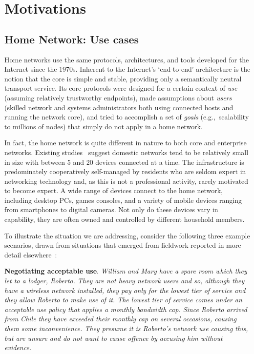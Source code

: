 \section{Motivations}\label{s:evolution}

\subsection{Home Network: Use cases}

Home networks use the same protocols, architectures, and tools developed for the
Internet since the 1970s.  Inherent to the Internet's `end-to-end' architecture
is the notion that the core is simple and stable, providing only a semantically
neutral transport service.  Its core protocols were designed for a certain
context of \emph{use} (assuming relatively trustworthy endpoints), made
assumptions about \emph{users} (skilled network and systems administrators both
using connected hosts and running the network core), and tried to accomplish a
set of \emph{goals} (e.g.,~scalability to millions of nodes) that simply do not
apply in a home network. 

In fact, the home network is quite different in nature to both core and
enterprise networks.  Existing
studies~\cite{tolmie07:_makin,shehan07:_home_networ_hci,shehanpoole08:_desig_inter_home_networ_maint_tools}
suggest domestic networks tend to be relatively small in size with between 5 and
20 devices connected at a time.  The infrastructure is predominately
cooperatively self-managed by residents who are seldom expert in networking
technology and, as this is not a professional activity, rarely motivated to
become expert.  A wide range of devices connect to the home network, including
desktop PCs, games consoles, and a variety of mobile devices ranging from
smartphones to digital cameras.  Not only do these devices vary in capability,
they are often owned and controlled by different household members.  

To illustrate the situation we are addressing, consider the following three
example scenarios, drawn from  situations that emerged from fieldwork 
reported in more detail elsewhere~\cite{wmust2011,Chetty10}: 
 
\textbf{Negotiating acceptable use}.  {\it William and Mary have a spare room
  which they let to a lodger, Roberto.  They are not heavy network users and so,
  although they have a wireless network installed, they pay only for the lowest
  tier of service and they allow Roberto to make use of it.  The lowest tier of
  service comes under an acceptable use policy that applies a monthly bandwidth
  cap.  Since Roberto arrived from Chile they have exceeded their monthly cap on
  several occasions, causing them some inconvenience.  They presume it is
  Roberto's network use causing this, but are unsure and do not want to cause
  offence by accusing him without evidence.}

